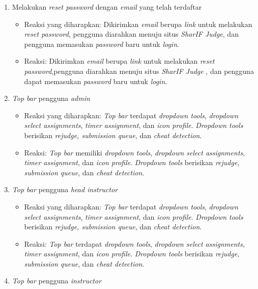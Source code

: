 \begin{enumerate}
\begin{itemize}
	 	\end{itemize}
	 \item Melakukan \textit{reset password} dengan \textit{email} yang telah terdaftar
	 	\begin{itemize}
	 		\item Reaksi yang diharapkan: Dikirimkan \textit{email} berupa \textit{link} untuk melakukan \textit{reset password}, pengguna diarahkan menuju situs \textit{SharIF Judge}, dan pengguna memasukan \textit{password} baru untuk \textit{login}.
	 		\item Reaksi: Dikirimkan \textit{email} berupa \textit{link} untuk melakukan \textit{reset password},pengguna diarahkan menuju situs \textit{SharIF Judge} , dan pengguna dapat memasukan \textit{password} baru untuk \textit{login}.
	 	\end{itemize}
	 \item \textit{Top bar} pengguna \textit{admin}
	 \begin{itemize}
	 	\item Reaksi yang diharapkan: \textit{Top bar} terdapat \textit{dropdown tools}, \textit{dropdown select assignments}, \textit{timer assignment}, dan \textit{icon profile}. \textit{Dropdown tools} berisikan \textit{rejudge, submission queue}, dan \textit{cheat detection}.
	 	\item Reaksi: \textit{Top bar} memiliki \textit{dropdown tools}, \textit{ dropdown select assignments}, \textit{timer assignment}, dan \textit{icon profile}. \textit{Dropdown tools} berisikan \textit{rejudge, submission queue}, dan \textit{cheat detection}.
	 \end{itemize}
	 \item \textit{Top bar} pengguna \textit{head instructor}
	 \begin{itemize}
	 	\item Reaksi yang diharapkan: \textit{Top bar} terdapat \textit{dropdown tools}, \textit{dropdown select assignments}, \textit{timer assignment}, dan \textit{icon profile}. \textit{Dropdown tools} berisikan \textit{rejudge, submission queue}, dan \textit{cheat detection}.
	 	\item Reaksi: \textit{Top bar} terdapat \textit{dropdown tools}, \textit{dropdown select assignments}, \textit{timer assignment}, dan \textit{icon profile}. \textit{Dropdown tools} berisikan \textit{rejudge, submission queue}, dan \textit{cheat detection}.
	 \end{itemize}
	 \item \textit{Top bar} pengguna \textit{instructor}

\end{enumerate}

